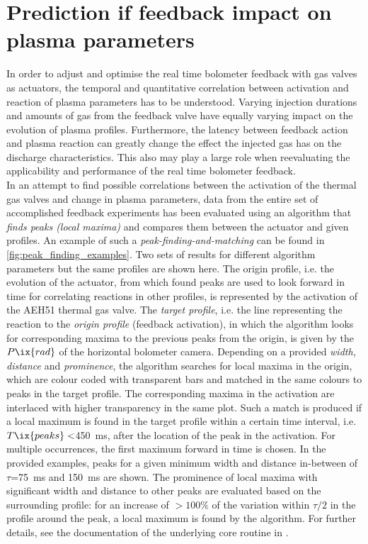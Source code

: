     \section{Prediction if feedback impact on plasma parameters}\label{apx:peaktopeak}%
%
        In order to adjust and optimise the real time bolometer feedback with gas valves as actuators, the temporal and quantitative correlation between activation and reaction of plasma parameters has to be understood. Varying injection durations and amounts of gas from the feedback valve have equally varying impact on the evolution of plasma profiles. Furthermore, the latency between feedback action and plasma reaction can greatly change the effect the injected gas has on the discharge characteristics. This also may play a large role when reevaluating the applicability and performance of the real time bolometer feedback.\\%
        In an attempt to find possible correlations between the activation of the thermal gas valves and change in plasma parameters, data from the entire set of accomplished feedback experiments has been evaluated using an algorithm that \textit{finds peaks (local maxima)} and compares them between the actuator and given profiles. An example of such a \textit{peak-finding-and-matching} can be found in \cref{fig:peak_finding_examples}. Two sets of results for different algorithm parameters but the same profiles are shown here. The origin profile, i.e. the evolution of the actuator, from which found peaks are used to look forward in time for correlating reactions in other profiles, is represented by the activation of the AEH51 thermal gas valve. The \textit{target profile}, i.e. the line representing the reaction to the \textit{origin profile} (feedback activation), in which the algorithm looks for corresponding maxima to the previous peaks from the origin, is given by the $P\ix{rad}$ of the horizontal bolometer camera. Depending on a provided \textit{width, distance} and \textit{prominence}, the algorithm searches for local maxima in the origin, which are colour coded with transparent bars and matched in the same colours to peaks in the target profile. The corresponding maxima in the activation are interlaced with higher transparency in the same plot. Such a match is produced if a local maximum is found in the target profile within a certain time interval, i.e. $T\ix{peaks}<$\SI{450}{\milli\second}, after the location of the peak in the activation. For multiple occurrences, the first maximum forward in time is chosen. In the provided examples, peaks for a given minimum width and distance in-between of $\tau$=\SI{75}{\milli\second} and \SI{150}{\milli\second} are shown. The prominence of local maxima with significant width and distance to other peaks are evaluated based on the surrounding profile: for an increase of $>100\%$ of the variation within $\tau/2$ in the profile around the peak, a local maximum is found by the algorithm. For further details, see the documentation of the underlying core routine in \cite{ScipyFindPeaks}.\\%
